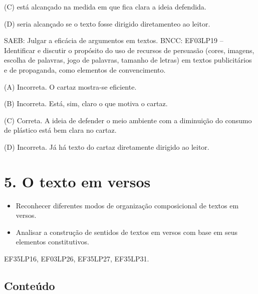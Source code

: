 (C) está alcançado na medida em que fica clara a ideia defendida.

(D) seria alcançado se o texto fosse dirigido diretamenteo ao leitor.

SAEB: Julgar a eficácia de argumentos em textos.
BNCC: EF03LP19 -- Identificar e discutir o propósito do uso de recursos de
persuasão (cores, imagens, escolha de palavras, jogo de palavras,
tamanho de letras) em textos publicitários e de propaganda, como
elementos de convencimento.

(A) Incorreta. O cartaz mostra-se eficiente.

(B) Incorreta. Está, sim, claro o que motiva o cartaz.

(C) Correta. A ideia de defender o meio ambiente com a diminuição do consumo de plástico está bem clara no cartaz.

(D) Incorreta. Já há texto do cartaz diretamente dirigido ao leitor.

\section{5. O texto em versos}\label{muxf3dulo-5}



\begin{itemize}
  \item Reconhecer diferentes modos de organização composicional de
textos em versos.
  \item Analisar a construção de sentidos de textos em versos com base
em seus elementos constitutivos.
\end{itemize}


\begin{itemize}
EF35LP16, EF03LP26, EF35LP27, EF35LP31.
\end{itemize}

\subsection{Conteúdo}\label{conteuxfado-4}

